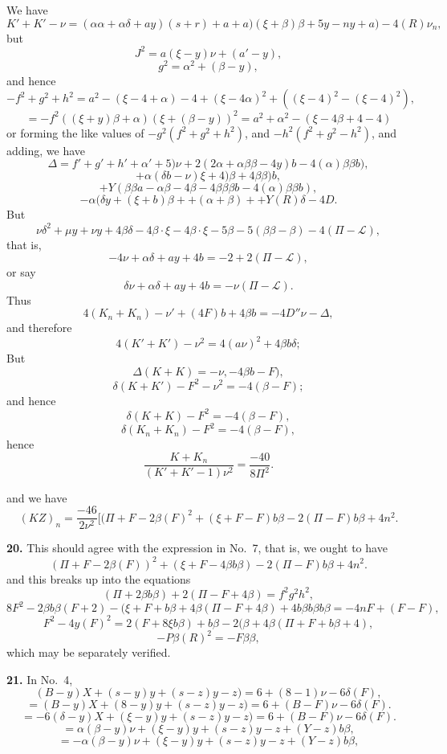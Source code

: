 \documentclass[11pt,a4paper]{article}
\begin{document}
We have
\[
K' + K' - \nu = (\alpha\alpha + \alpha\delta + ay)(s + r) + a + a)(\xi + \beta)\beta + 5y - n y + a) - 4(R)\nu_n,
\]
but
\[
J^2 = a(\xi - y)\nu + (a' - y),
\]
\[
g^2 = \alpha^2 + (\beta - y),
\]
and hence
\[
- f^2 + g^2 + h^2 = a^2 - (\xi - 4 + \alpha) - 4 + (\xi - 4\alpha)^2 + ((\xi - 4)^2 - (\xi - 4)^2),
\]
\[
= - f^2((\xi + y)\beta + \alpha)(\xi + (\beta - y))^2 = a^2 + \alpha^2 - (\xi - 4\beta + 4 - 4)
\]
or forming the like values of $- g^2(f^2 + g^2 + h^2)$, and $- h^2(f^2 + g^2 - h^2)$, and adding, we have
\[
\Delta = f' + g' + h' + \alpha' + 5)\nu + 2(2\alpha + \alpha\beta\beta - 4y)b - 4(\alpha)\beta\beta b),
\]
\[
+ \alpha(\delta b - \nu)\xi + 4)\beta + 4\beta\beta)b,
\]
\[
+ Y(\beta\beta a - \alpha\beta - 4\beta - 4\beta\beta\beta b - 4(\alpha)\beta\beta b),
\]
\[
- \alpha(\delta y + (\xi + b)\beta + + (\alpha + \beta) + + Y(R)\delta - 4D.
\]
But
\[
\nu\delta^2 + \mu y + \nu y + 4\beta\delta - 4\beta \cdot \xi - 4\beta \cdot \xi - 5\beta - 5(\beta\beta - \beta) - 4(\Pi - \mathcal{L}),
\]
that is,
\[
- 4\nu + \alpha\delta + ay + 4b = -2 + 2(\Pi - \mathcal{L}),
\]
or say
\[
\delta\nu + \alpha\delta + ay + 4b = - \nu (\Pi - \mathcal{L}).
\]
Thus
\[
4(K_n + K_n) - \nu' + (4F)b + 4\beta b = - 4D''\nu - \Delta,
\]
and therefore
\[
4(K' + K') - \nu^2 = 4(a\nu)^2 + 4\beta b\delta;
\]
But
\[
\Delta(K + K) = - \nu, - 4\beta b - F),
\]
\[
\delta(K + K') - F^2 - \nu^2 = - 4(\beta - F);
\]
and hence
\[
\delta(K + K) - F^2 = - 4(\beta - F),
\]
\[
\delta(K_n + K_n) - F^2 = - 4(\beta - F),
\]
hence
\[
\frac{K + K_n}{(K' + K' - 1)\nu^2} = \frac{-40}{8\Pi^2}.
\]

and we have
\[
(KZ)_n = \frac{-46}{2\nu^2}[(\Pi + F - 2\beta(F)^2 + (\xi + F - F)b\beta - 2(\Pi - F)b\beta + 4n^2.
\]

\textbf{20.} This should agree with the expression in No.\ 7, that is, we ought to have
\[
(\Pi + F - 2\beta(F))^2 + (\xi + F - 4\beta b\beta) - 2(\Pi - F)b\beta + 4n^2.
\]
and this breaks up into the equations
\[
(\Pi + 2\beta b\beta) + 2(\Pi - F + 4\beta) = f^2 g^2 h^2,
\]
\[
8F^2 - 2\beta b\beta(F + 2) - (\xi + F + b\beta + 4\beta(\Pi - F + 4\beta) + 4b\beta b\beta b\beta = - 4nF + (F - F),
\]
\[
F^2 - 4y(F)^2 = 2(F + 8\xi b\beta) + b\beta - 2(\beta + 4\beta(\Pi + F + b\beta + 4),
\]
\[
- P\beta(R)^2 = - F\beta\beta,
\]
which may be separately verified.

\textbf{21.} In No.\ 4,
\[
(B - y)X + (s - y)y + (s - z)y - z) = 6 + (8 - 1)\nu - 6\delta(F),
\]
\[
= (B - y)X + (8 - y)y + (s - z)y - z) = 6 + (B - F)\nu - 6\delta(F).
\]
\[
= - 6(\delta - y)X + (\xi - y)y + (s - z)y - z) = 6 + (B - F)\nu - 6\delta(F).
\]
\[
= \alpha(\beta - y)\nu + (\xi - y)y + (s - z)y - z + (Y - z)b\beta,
\]
\[
= -\alpha(\beta - y)\nu + (\xi - y)y + (s - z)y - z + (Y - z)b\beta,
\]
\end{document}

